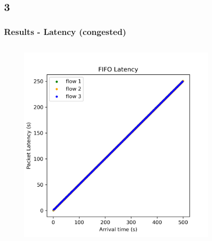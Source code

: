 \documentclass[compress]{beamer}
\begin{document}
    \subsection{3}
    \begin{frame}
        \frametitle{Results - Latency (congested)}
        \begin{columns}
            \begin{column}{0.5\textwidth}
                \begin{figure}
                    \centering
                    \includegraphics[width=\textwidth]{img/FIFO_Latency}
                \end{figure}
            \end{column}
            \begin{column}{0.5\textwidth}
                \begin{figure}
                    \centering

\end{figure}
\end{column}
\end{columns}
\end{frame}
\end{document}
